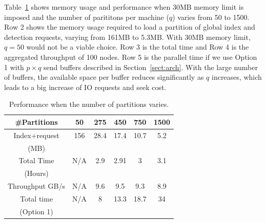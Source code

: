  
Table~\ref{tab:overall} shows memory usage and performance when 30MB memory limit is imposed and
the number of parititons per machine ($q$) varies from 50 to 1500.
Row 2 shows the memory usage required to load a partition of global index and detection requests,
varying from 161MB to 5.3MB. With  30MB memory limit,  $q=50$ would not be a viable choice.
Row 3 is the total time and Row 4 is  the aggregated throughput of  100 nodes.
Row 5 is  the parallel time if  we use Option 1 with $p\times q$ send buffers 
described in Section~\ref{sect:arch}. 
With the large number of buffers, the available space per buffer reduces significantly as $q$ increases, which leads to
a big increase of IO requests and seek cost.  

\begin{table}[hbt]
\caption{ Performance when the number of partitions varies.}
\begin{center}
\begin{tabular} {|c|c|c|c|c|c|}
\hline \#Partitions  & 50 & 275  &450 &  750 &  1500 \\
\hline Index+request & 156&  28.4 & 17.4 & 10.7 & 5.2 \\
  (MB)           &  &   &  & &  \\

\hline Total Time  & N/A&  2.9 & 2.91 & 3 & 3.1 \\
  (Hours)           &  &   &  & &  \\
\hline Throughput GB/s& N/A&  9.6& 9.5 & 9.3 & 8.9 \\
\hline Total time & N/A&  8& 13.3 & 18.7 & 34 \\
  (Option 1)           &  &   &  & &  \\
\hline
\end{tabular}
\end{center}
\label{tab:overall}
\end{table}

%

